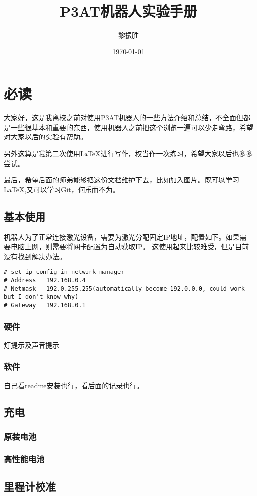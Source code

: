 \documentclass[a4paper,twoside,cs4size,fancyhdr,notitlepage]{ctexart}
\title{P3AT机器人实验手册}
\author{黎振胜}
\date{\today}
\begin{document}
\maketitle{}

\section{必读}
大家好，这是我离校之前对使用P3AT机器人的一些方法介绍和总结，不全面但都是一些很基本和重要的东西，使用机器人之前把这个浏览一遍可以少走弯路，希望对大家以后的实验有帮助。

另外这算是我第二次使用\LaTeX 进行写作，权当作一次练习，希望大家以后也多多尝试。

最后，希望后面的师弟能够把这份文档维护下去，比如加入图片。既可以学习\LaTeX ,又可以学习Git，何乐而不为。

\subsection{基本使用}
机器人为了正常连接激光设备，需要为激光分配固定IP地址，配置如下。如果需要电脑上网，则需要将网卡配置为自动获取IP。
这使用起来比较难受，但是目前没有找到解决办法。
\begin{lstlisting}
# set ip config in network manager
# Address	192.168.0.4
# Netmask	192.0.255.255(automatically become 192.0.0.0, could work but I don't know why)
# Gateway	192.168.0.1
\end{lstlisting}
\subsubsection{硬件}
灯提示及声音提示
\subsubsection{软件}
自己看readme安装也行，看后面的记录也行。
\subsection{充电}
\subsubsection{原装电池}
\subsubsection{高性能电池}
\subsection{里程计校准}
\end{document}
